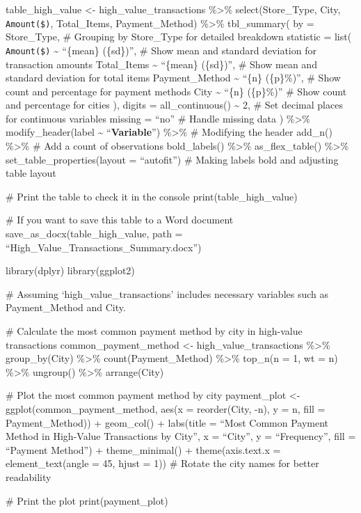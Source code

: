\documentclass[
]{article}
\begin{document}
table\_high\_value \textless- high\_value\_transactions \%\textgreater\%
select(Store\_Type, City, \texttt{Amount(\$)}, Total\_Items,
Payment\_Method) \%\textgreater\% tbl\_summary( by = Store\_Type, \#
Grouping by Store\_Type for detailed breakdown statistic = list(
\texttt{Amount(\$)} \textasciitilde{} ``\{mean\} (\{sd\})'', \# Show
mean and standard deviation for transaction amounts Total\_Items
\textasciitilde{} ``\{mean\} (\{sd\})'', \# Show mean and standard
deviation for total items Payment\_Method \textasciitilde{} ``\{n\}
(\{p\}\%)'', \# Show count and percentage for payment methods City
\textasciitilde{} ``\{n\} (\{p\}\%)'' \# Show count and percentage for
cities ), digits = all\_continuous() \textasciitilde{} 2, \# Set decimal
places for continuous variables missing = ``no'' \# Handle missing data
) \%\textgreater\% modify\_header(label \textasciitilde{}
``\textbf{Variable}'') \%\textgreater\% \# Modifying the header add\_n()
\%\textgreater\% \# Add a count of observations bold\_labels()
\%\textgreater\% as\_flex\_table() \%\textgreater\%
set\_table\_properties(layout = ``autofit'') \# Making labels bold and
adjusting table layout

\# Print the table to check it in the console print(table\_high\_value)

\# If you want to save this table to a Word document
save\_as\_docx(table\_high\_value, path =
``High\_Value\_Transactions\_Summary.docx'')

library(dplyr) library(ggplot2)

\# Assuming `high\_value\_transactions' includes necessary variables
such as Payment\_Method and City.

\# Calculate the most common payment method by city in high-value
transactions common\_payment\_method \textless-
high\_value\_transactions \%\textgreater\% group\_by(City)
\%\textgreater\% count(Payment\_Method) \%\textgreater\% top\_n(n = 1,
wt = n) \%\textgreater\% ungroup() \%\textgreater\% arrange(City)

\# Plot the most common payment method by city payment\_plot \textless-
ggplot(common\_payment\_method, aes(x = reorder(City, -n), y = n, fill =
Payment\_Method)) + geom\_col() + labs(title = ``Most Common Payment
Method in High-Value Transactions by City'', x = ``City'', y =
``Frequency'', fill = ``Payment Method'') + theme\_minimal() +
theme(axis.text.x = element\_text(angle = 45, hjust = 1)) \# Rotate the
city names for better readability

\# Print the plot print(payment\_plot)
\end{document}
